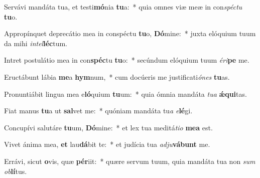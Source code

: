 \item Servávi mandáta tua, et testi\textbf{mó}nia \textbf{tu}a:~* quia omnes viæ meæ in con\textit{spéc}\textit{tu} \textbf{tu}o.
\item Appropínquet deprecátio mea in conspéctu \textbf{tu}o, \textbf{Dó}mine:~* juxta elóquium tuum da mihi \textit{in}\textit{tel}\textbf{léc}tum.
\item Intret postulátio mea in con\textbf{spéc}tu \textbf{tu}o:~* secúndum elóquium tuum \textit{é}\textit{ri}\textbf{pe} me.
\item Eructábunt lábia \textbf{me}a \textbf{hym}num,~* cum docúeris me justificati\textit{ó}\textit{nes} \textbf{tu}as.
\item Pronuntiábit lingua mea e\textbf{ló}quium \textbf{tu}um:~* quia ómnia mandáta \textit{tu}\textit{a} \textbf{ǽ}\textbf{qui}tas.
\item Fiat manus \textbf{tu}a ut \textbf{sal}vet me:~* quóniam mandáta tu\textit{a} \textit{e}\textbf{lé}gi.
\item Concupívi salutáre \textbf{tu}um, \textbf{Dó}mine:~* et lex tua meditá\textit{ti}\textit{o} \textbf{me}\textbf{a} est.
\item Vivet ánima mea, \textbf{et} lau\textbf{dá}bit te:~* et judícia tua \textit{ad}\textit{ju}\textbf{vá}\textbf{bunt} me.
\item Errávi, sicut \textbf{o}vis, quæ \textbf{pér}iit:~* quære servum tuum, quia mandáta tua non \textit{sum} \textit{ob}\textbf{lí}tus.
